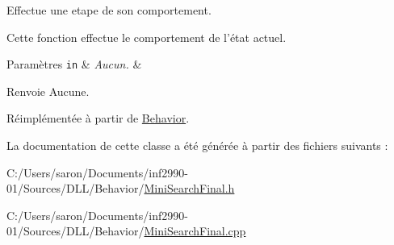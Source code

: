 Effectue une etape de son comportement. 

Cette fonction effectue le comportement de l'état actuel.


\begin{DoxyParams}[1]{Paramètres}
\mbox{\tt in}  & {\em Aucun.} & \\
\hline
\end{DoxyParams}
\begin{DoxyReturn}{Renvoie}
Aucune. 
\end{DoxyReturn}


Réimplémentée à partir de \hyperlink{group__inf2990_gac22f205bc85075ff707ad1f695c18439}{Behavior}.



La documentation de cette classe a été générée à partir des fichiers suivants \-:\begin{DoxyCompactItemize}
\item 
C\-:/\-Users/saron/\-Documents/inf2990-\/01/\-Sources/\-D\-L\-L/\-Behavior/\hyperlink{_mini_search_final_8h}{Mini\-Search\-Final.\-h}\item 
C\-:/\-Users/saron/\-Documents/inf2990-\/01/\-Sources/\-D\-L\-L/\-Behavior/\hyperlink{_mini_search_final_8cpp}{Mini\-Search\-Final.\-cpp}\end{DoxyCompactItemize}
